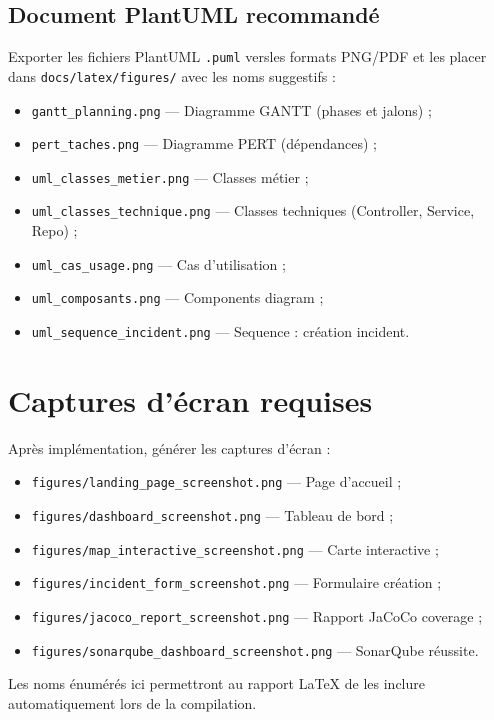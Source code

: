 \documentclass[12pt,a4paper,twoside,openright]{book}
\begin{document}
\section{Document PlantUML recommandé}
Exporter les fichiers PlantUML \texttt{.puml} versles formats PNG/PDF et les placer dans \texttt{docs/latex/figures/} avec les noms suggestifs :
\begin{itemize}
  \item \texttt{gantt\_planning.png} — Diagramme GANTT (phases et jalons) ;
  \item \texttt{pert\_taches.png} — Diagramme PERT (dépendances) ;
  \item \texttt{uml\_classes\_metier.png} — Classes métier ;
  \item \texttt{uml\_classes\_technique.png} — Classes techniques (Controller, Service, Repo) ;
  \item \texttt{uml\_cas\_usage.png} — Cas d'utilisation ;
  \item \texttt{uml\_composants.png} — Components diagram ;
  \item \texttt{uml\_sequence\_incident.png} — Sequence : création incident.
\end{itemize}

\chapter{Captures d'écran requises}
\label{app:captures}
Après implémentation, générer les captures d'écran :
\begin{itemize}
  \item \texttt{figures/landing\_page\_screenshot.png} — Page d'accueil ;
  \item \texttt{figures/dashboard\_screenshot.png} — Tableau de bord ;
  \item \texttt{figures/map\_interactive\_screenshot.png} — Carte interactive ;
  \item \texttt{figures/incident\_form\_screenshot.png} — Formulaire création ;
  \item \texttt{figures/jacoco\_report\_screenshot.png} — Rapport JaCoCo coverage ;
  \item \texttt{figures/sonarqube\_dashboard\_screenshot.png} — SonarQube réussite.
\end{itemize}

Les noms énumérés ici permettront au rapport LaTeX de les inclure automatiquement lors de la compilation.
\end{document}
